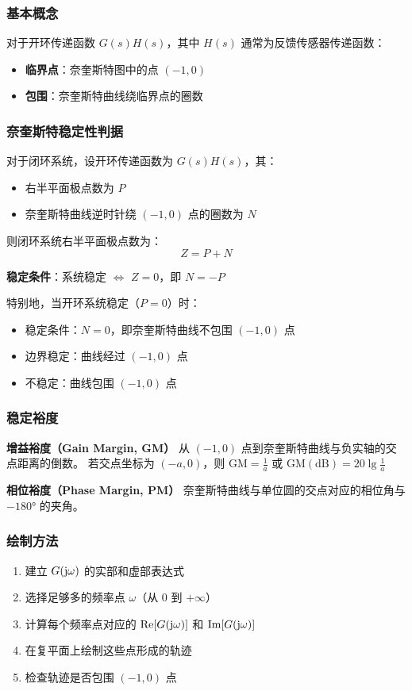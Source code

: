 \subsubsection{基本概念}
对于开环传递函数 $G(s)H(s)$，其中 $H(s)$ 通常为反馈传感器传递函数：
\begin{itemize}
    \item \textbf{临界点}：奈奎斯特图中的点 $(-1, 0)$
    \item \textbf{包围}：奈奎斯特曲线绕临界点的圈数
\end{itemize}

\subsubsection{奈奎斯特稳定性判据}
对于闭环系统，设开环传递函数为 $G(s)H(s)$，其：
\begin{itemize}
    \item 右半平面极点数为 $P$
    \item 奈奎斯特曲线逆时针绕 $(-1, 0)$ 点的圈数为 $N$
\end{itemize}

则闭环系统右半平面极点数为：
$$Z = P + N$$

\textbf{稳定条件}：系统稳定 $\Leftrightarrow$ $Z = 0$，即 $N = -P$

特别地，当开环系统稳定（$P = 0$）时：
\begin{itemize}
    \item 稳定条件：$N = 0$，即奈奎斯特曲线不包围 $(-1, 0)$ 点
    \item 边界稳定：曲线经过 $(-1, 0)$ 点
    \item 不稳定：曲线包围 $(-1, 0)$ 点
\end{itemize}

\subsubsection{稳定裕度}

\textbf{增益裕度（Gain Margin, GM）}
从 $(-1, 0)$ 点到奈奎斯特曲线与负实轴的交点距离的倒数。
若交点坐标为 $(-a, 0)$，则 $\text{GM} = \frac{1}{a}$ 或 $\text{GM}(\text{dB}) = 20\lg\frac{1}{a}$

\textbf{相位裕度（Phase Margin, PM）}
奈奎斯特曲线与单位圆的交点对应的相位角与 $-180°$ 的夹角。

\subsubsection{绘制方法}
\begin{enumerate}
    \item 建立 $G(\mathrm{j}\omega)$ 的实部和虚部表达式
    \item 选择足够多的频率点 $\omega$（从 $0$ 到 $+\infty$）
    \item 计算每个频率点对应的 $\text{Re}[G(\mathrm{j}\omega)]$ 和 $\text{Im}[G(\mathrm{j}\omega)]$
    \item 在复平面上绘制这些点形成的轨迹
    \item 检查轨迹是否包围 $(-1, 0)$ 点
\end{enumerate}

